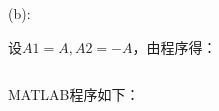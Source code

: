 \documentclass[12pt,a4paper,utf8]{ctexart}
\begin{document}
\begin{enumerate}
(b):

设$A1=A,A2=-A$，由程序得：
\begin{lstlisting}[frame=single]

\end{lstlisting}

MATLAB程序如下：


\begin{lstlisting}[frame=single]

\end{lstlisting}

\end{enumerate}
\end{document}
